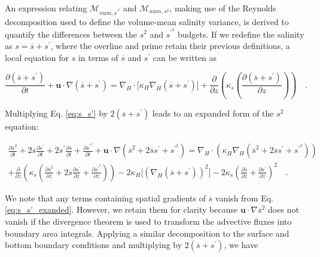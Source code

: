 \documentclass[draft]{agujournal2019}
\begin{document}
An expression relating $\mathcal{M}_{num, s^{\prime^2}}$ and $\mathcal{M}_{num, s^2}$, making use of the Reynolds decomposition used to define the volume-mean salinity variance, is derived to quantify the differences between the $s^2$ and $s^{\prime^2}$ budgets. If we redefine the salinity as $s = \overline{s}+s^\prime$, where the overline and prime retain their previous definitions, a local equation for $s$ in terms of $\overline{s}$ and $s^\prime$ can be written as
\begin{linenomath*}
\begin{equation} \label{eq:s_s'}
    \frac{\partial (\overline{s}+ s^\prime)}{\partial t}+ \textbf{u} \cdot \nabla(\overline{s}+ s^\prime) = \nabla_H \cdot \big[\kappa_H \nabla_H (\overline{s}+s^\prime) \big]+ \frac{\partial}{\partial z} \left(\kappa_s \left(\frac{\partial (\overline{s}+ s^\prime)}{\partial z} \right) \right) \quad .
\end{equation}
\end{linenomath*}
Multiplying Eq. \ref{eq:s_s'} by $2(\overline{s}+s^\prime)$ leads to an expanded form of the $s^2$ equation:
\begin{linenomath*}
\begin{equation} \label{eq:s_s'_exanded}
    \begin{split}
        \frac{\partial \overline{s}^2}{\partial t} + 2\overline{s} \frac{\partial s^\prime}{\partial t} +2s^\prime \frac{\partial \overline{s}}{\partial t} + \frac{\partial s^{\prime^2}}{\partial t}+
        \textbf{u} \cdot \nabla(\overline{s}^2+2 \overline{s} s^\prime+s^{\prime^2}) = \nabla_H \cdot \left(\kappa_H \nabla_H \left(\overline{s}^2+2\overline{s}s^{\prime}+s^{\prime^2} \right) \right) \\
        + \frac{\partial}{\partial z} \left(\kappa_s \left(\frac{\partial \overline{s}^2}{\partial z} + 2\overline{s} \frac{\partial s^\prime}{\partial z} + \frac{\partial s^{\prime^2}}{\partial z} \right) \right) -2\kappa_H \big[(\nabla_H (\overline{s}+s^\prime))^2 \big]-2 \kappa_s \left(\frac{\partial \overline{s}}{\partial z} + \frac{\partial s^\prime}{\partial z} \right)^{2} \quad .
    \end{split}
\end{equation}
\end{linenomath*}
We note that any terms containing spatial gradients of $\overline{s}$ vanish from Eq. \ref{eq:s_s'_exanded}. However, we retain them for clarity because $\mathbf{u} \cdot \nabla \overline{s}^2$ does not vanish if the divergence theorem is used to transform the advective fluxes into boundary area integrals. Applying a similar decomposition to the surface and bottom boundary conditions and multiplying by $2(\overline{s}+s^\prime)$,  we have
\end{document}
